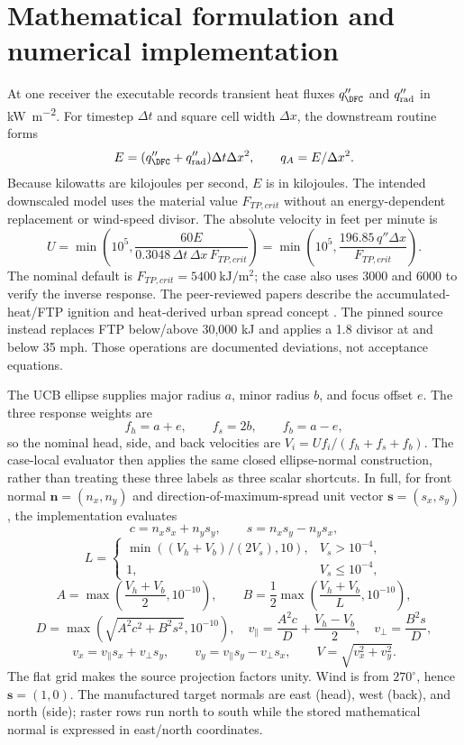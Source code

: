 \ReportOverview

\section{Mathematical formulation and numerical implementation}

At one receiver the executable records transient heat fluxes
\(q''_{\DFC}\) and \(q''_{\rm rad}\) in \si{\kilo\watt\per\square\metre}.
For timestep \(\Delta t\) and square cell width \(\Delta x\), the downstream
routine forms
\[
 E=(q''_{\DFC}+q''_{\rm rad})\Delta t\Delta x^2,
 \qquad q_A=E/\Delta x^2 .
\]
Because kilowatts are kilojoules per second, \(E\) is in kilojoules. The
intended downscaled model uses the material value $F_{TP,crit}$ without an
energy-dependent replacement or wind-speed divisor. The absolute velocity in
feet per minute is
\[
 U=\min\!\left(10^5,
 \frac{60E}{0.3048\,\Delta t\,\Delta x\,F_{TP,crit}}\right)
 =\min\!\left(10^5,\frac{196.85\,q''\Delta x}{F_{TP,crit}}\right).
\]
The nominal default is $F_{TP,crit}=5400~\si{\kilo\joule\per\square\metre}$;
the case also uses 3000 and 6000 to verify the inverse response. The
peer-reviewed papers describe the accumulated-heat/FTP ignition and
heat-derived urban spread concept \cite{PurnomoPCI2024,PurnomoIJWF2024}.
The pinned source instead replaces FTP below/above 30,000 kJ and applies a
1.8 divisor at and below 35 mph. Those operations are documented deviations,
not acceptance equations.

The UCB ellipse supplies major radius \(a\), minor radius \(b\), and focus
offset \(e\).  The three response weights are
\[
 f_h=a+e,\qquad f_s=2b,\qquad f_b=a-e,
\]
so the nominal head, side, and back velocities are
\(V_i=Uf_i/(f_h+f_s+f_b)\).  The case-local evaluator then applies the same
closed ellipse-normal construction, rather than treating these three labels as
three scalar shortcuts.  In full, for front normal
\(\boldsymbol n=(n_x,n_y)\) and direction-of-maximum-spread unit vector
\(\boldsymbol s=(s_x,s_y)\), the implementation evaluates
\[
 c=n_xs_x+n_ys_y,\qquad s=n_xs_y-n_ys_x,
\]
\[
 L=\begin{cases}
 \min\!\left((V_h+V_b)/(2V_s),10\right),&V_s>10^{-4},\\
 1,&V_s\leq10^{-4},
 \end{cases}
\]
\[
 A=\max\!\left(\frac{V_h+V_b}{2},10^{-10}\right),\qquad
 B=\frac12\max\!\left(\frac{V_h+V_b}{L},10^{-10}\right),
\]
\[
 D=\max\!\left(\sqrt{A^2c^2+B^2s^2},10^{-10}\right),\quad
 v_{\parallel}=\frac{A^2c}{D}+\frac{V_h-V_b}{2},\quad
 v_{\perp}=\frac{B^2s}{D},
\]
\[
 v_x=v_{\parallel}s_x+v_{\perp}s_y,\qquad
 v_y=v_{\parallel}s_y-v_{\perp}s_x,\qquad
 V=\sqrt{v_x^2+v_y^2}.
\]
The flat grid makes the source projection factors unity.  Wind is from
\(270^\circ\), hence \(\boldsymbol s=(1,0)\).  The manufactured target normals
are east (head), west (back), and north (side); raster rows run north to south
while the stored mathematical normal is expressed in east/north coordinates.

